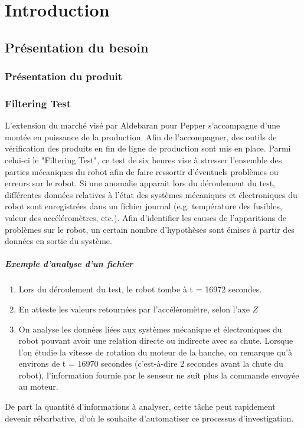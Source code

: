 \chapter{Introduction}
\label{Introduction}
\thispagestyle{fancy}

\section{Présentation du besoin}
\label{Introduction:Contexte}

\subsection{Présentation du produit}
\label{Introduction:Contexte:Filtering Le Hardware de Pepper}


\subsection{Filtering Test}
\label{Introduction:Contexte:Filtering Test}
L'extension du marché visé par Aldebaran pour Pepper s'accompagne d'une montée en puissance de la production. Afin de l'accompagner, des outils de vérification des produits en fin de ligne de production sont mis en place. Parmi celui-ci le "Filtering Test", ce test de six heures vise à stresser l'ensemble des parties mécaniques du robot afin de faire ressortir d'éventuels problèmes ou erreurs sur le robot. Si une anomalie apparait lors du déroulement du test, différentes données relatives à l'état des systèmes mécaniques et électroniques du robot sont enregistrées dans un fichier journal (e.g. température des fusibles, valeur des accéléromètres, etc.). Afin d'identifier les causes de l'apparitions de problèmes sur le robot, un certain nombre d'hypothèses sont émises à partir des données en sortie du système. 

\paragraph{Exemple d'analyse d'un fichier}
\begin{enumerate}
	\item Lors du déroulement du test, le robot tombe à t = 16972 secondes.
	\item En atteste les valeurs retournées par l'accéléromètre, selon l'axe $Z$
	\item On analyse les données liées aux systèmes mécanique et électroniques du robot pouvant avoir une relation directe ou indirecte avec sa chute.  
	Lorsque l'on étudie la vitesse de rotation du moteur de la hanche, on remarque qu'à environs de  t = 16970 secondes (c'est-à-dire 2 secondes avant la chute du robot),  l'information fournie par le senseur ne suit plus la commande  envoyée au moteur.
\end{enumerate}


De part la quantité d'informations à analyser, cette tâche peut rapidement devenir rébarbative, d'où le souhaite d'automatiser ce processus d'investigation.
